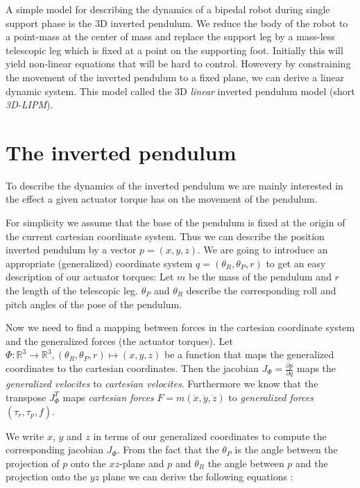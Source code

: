 \documentclass[english,ngerman]{KITreprt}
\newcommand{\clr}[2]{{\color{#1}{#2}}}
\newcommand{\todo}[1]{\marginpar{\clr{red}{#1}}}
\begin{document}
\todo{picture of 3D-LIPM}

A simple model for describing the dynamics of a bipedal robot during
single support phase is the 3D inverted pendulum. We reduce the body of
the robot to a point-mass at the center of mass and replace the support
leg by a mass-less telescopic leg which is fixed at a point on the
supporting foot. Initially this will yield non-linear equations that
will be hard to control. Howevery by constraining the movement of the
inverted pendulum to a fixed plane, we can derive a linear dynamic
system. This model called the 3D \emph{linear} inverted pendulum model
(short \emph{3D-LIPM}).

\section{The inverted pendulum}\label{the-inverted-pendulum}

To describe the dynamics of the inverted pendulum we are mainly
interested in the effect a given actuator torque has on the movement of
the pendulum.

For simplicity we assume that the base of the pendulum is fixed at the
origin of the current cartesian coordinate system. Thus we can describe
the position inverted pendulum by a vector $p = (x, y, z)$. We are going
to introduce an appropriate (generalized) coordinate system
$q = (\theta_R, \theta_P, r)$ to get an easy description of our actuator
torques: Let $m$ be the mass of the pendulum and $r$ the length of the
telescopic leg. $\theta_P$ and $\theta_R$ describe the corresponding
roll and pitch angles of the pose of the pendulum.
\todo{add image with angles here}

Now we need to find a mapping between forces in the cartesian coordinate
system and the generalized forces (the actuator torques). Let
$\Phi: \mathbb{R}^3 \longrightarrow \mathbb{R}^3, (\theta_R, \theta_P, r) \mapsto (x, y, z)$
be a function that maps the generalized coordinates to the cartesian
coordinates. Then the jacobian $J_\Phi = \frac{\partial p}{\partial q}$
maps the \emph{generalized velocites} to \emph{cartesian velocites}.
Furthermore we know that the transpose $J_\Phi^T$ maps \emph{cartesian
forces} $F = m (\ddot x, \ddot y, \ddot z)$ to \emph{generalized forces}
$(\tau_r, \tau_p, f)$.

We write $x$, $y$ and $z$ in terms of our generalized coordinates to
compute the corresponding jacobian $J_\Phi$. From the fact that the
$\theta_P$ is the angle between the projection of $p$ onto the
$xz$-plane and $p$ and $\theta_R$ the angle between $p$ and the
projection onto the $yz$ plane we can derive the following equations
\todo{reference paper}:
\end{document}
